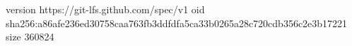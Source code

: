 version https://git-lfs.github.com/spec/v1
oid sha256:a86afe236ed30758caa763fb3ddfdfa5ca33b0265a28c720cdb356c2e3b17221
size 360824
